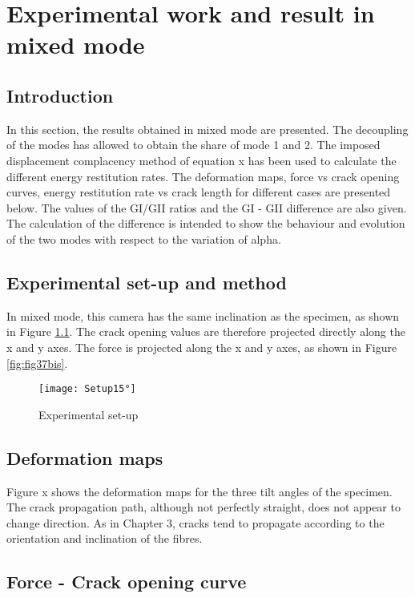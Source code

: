 \chapter{Experimental work and result in mixed mode}
\label{Chapter2}

\section{Introduction}

In this section, the results obtained in mixed mode are presented. The decoupling of the modes has allowed to obtain the share of mode 1 and 2. The imposed displacement complacency method of equation x has been used to calculate the different energy restitution rates. The deformation maps, force vs crack opening curves, energy restitution rate vs crack length for different cases are presented below. The values of the GI/GII ratios and the GI - GII difference are also given. The calculation of the difference is intended to show the behaviour and evolution of the two modes with respect to the variation of alpha.

\section{Experimental set-up and method}

In mixed mode, this camera has the same inclination as the specimen, as shown in Figure \ref{fig:Setup15°}. The crack opening values are therefore projected directly along the x and y axes. The force is projected along the x and y axes, as shown in Figure \ref{fig:fig37bis}.

\begin{figure}[htp]
	\centering
	\texttt{[image: Setup15°]}
	\caption{Experimental set-up}
	\label{fig:Setup15°}
\end{figure}

\section{Deformation maps}

Figure x shows the deformation maps for the three tilt angles of the specimen. The crack propagation path, although not perfectly straight, does not appear to change direction. As in Chapter 3, cracks tend to propagate according to the orientation and inclination of the fibres.

\section{Force - Crack opening curve}

